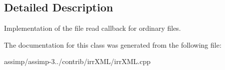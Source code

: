 \subsection{Detailed Description}
Implementation of the file read callback for ordinary files. 

The documentation for this class was generated from the following file\+:\begin{DoxyCompactItemize}
\item 
assimp/assimp-\/3../contrib/irr\+X\+M\+L/irr\+X\+M\+L.\+cpp\end{DoxyCompactItemize}

